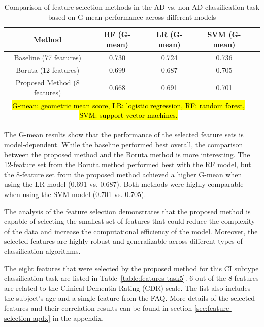 \begin{table}[!ht]
    \centering
    \caption{Comparison of feature selection methods in the AD vs. non-AD classification task based on G-mean performance across different models}
    \begin{tabular}{|c|c|c|c|c|}
    \hline
        Method & RF (G-mean) & LR (G-mean) & SVM (G-mean) \\ \hline
        Baseline (77 features) & 0.730 & 0.724 & 0.736 \\ \hline
        Boruta (12 features) & 0.699 & 0.687 & 0.705 \\ \hline
        Proposed Method (8 features) & 0.668 & 0.691 & 0.701 \\ \hline
        \multicolumn{4}{p{400pt}}{\footnotesize \hl{G-mean: geometric mean score, LR: logistic regression, RF: random forest, SVM: support vector machines.}}
    \end{tabular}
    \label{table:fs-task5-more-models}
\end{table}

The G-mean results show that the performance of the selected feature sets is model-dependent. While the baseline performed best overall, the comparison between the proposed method and the Boruta method is more interesting. The 12-feature set from the Boruta method performed best with the RF model, but the 8-feature set from the proposed method achieved a higher G-mean when using the LR model (0.691 vs. 0.687). Both methods were highly comparable when using the SVM model (0.701 vs. 0.705).

The analysis of the feature selection demonstrates that the proposed method is capable of selecting the smallest set of features that could reduce the complexity of the data and increase the computational efficiency of the model. Moreover, the selected features are highly robust and generalizable across different types of classification algorithms.

The eight features that were selected by the proposed method for this CI subtype classification task are listed in Table~\ref{table:features-task5}. 6 out of the 8 features are related to the Clinical Dementia Rating (\acrshort{CDR}) scale. The list also includes the subject's age and a single feature from the FAQ. More details of the selected features and their correlation results can be found in section \ref{sec:feature-selection-apdx} in the appendix.

